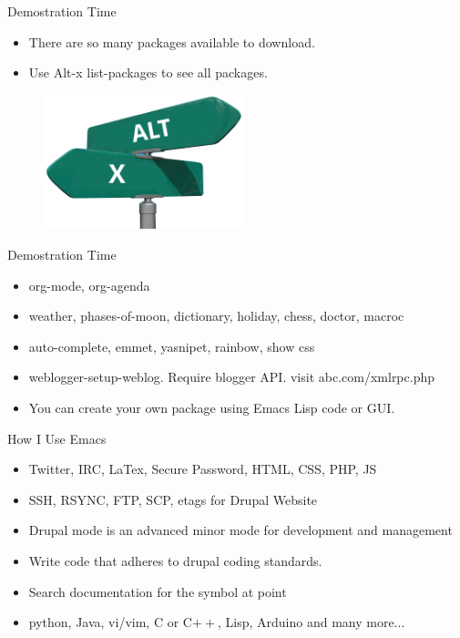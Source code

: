 \documentclass[english,12pt,presentation]{beamer}
\begin{document}
\begin{frame}{Demostration Time}
\begin{itemize}
\pause \item There are so many packages available to download.
\pause \item Use Alt-x list-packages to see all packages.
\end{itemize}
\begin{figure}
\centering
\includegraphics[width=220]{images/altx.png}
\end{figure}
\end{frame}

\begin{frame}{Demostration Time}
\begin{itemize}
\pause \item org-mode, org-agenda
\pause \item weather, phases-of-moon, dictionary, holiday, chess, doctor, macroc
\pause \item auto-complete, emmet, yasnipet, rainbow, show css
\pause \item weblogger-setup-weblog. Require blogger API. visit abc.com/xmlrpc.php
\pause \item You can create your own package using Emacs Lisp code or GUI.
\end{itemize}
\end{frame}

\begin{frame}{How I Use Emacs}
\begin{itemize}
\pause \item Twitter, IRC, LaTex, Secure Password, HTML, CSS, PHP, JS
\pause \item SSH, RSYNC, FTP, SCP, etags for Drupal Website
\pause \item Drupal mode is an advanced minor mode for development and management
\pause \item Write code that adheres to drupal coding standards.
\pause \item Search documentation for the symbol at point
\pause \item python, Java, vi/vim, C or C$++$, Lisp, Arduino and many more...
\end{itemize}
\end{frame}
\end{document}
